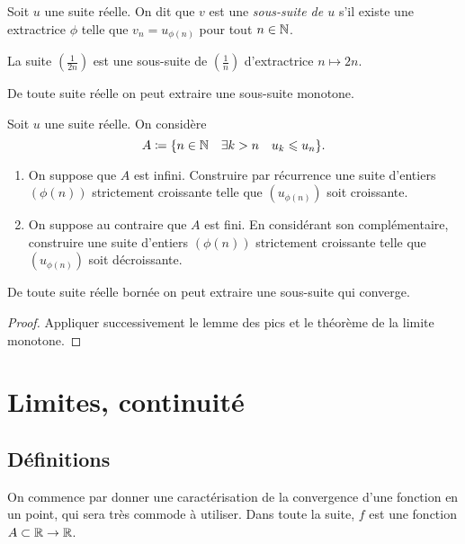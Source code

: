 \documentclass[../main.tex]{subfiles}
\begin{document}
\begin{mydef}
	Soit $u$ une suite réelle. On dit que $v$ est une \textit{sous-suite de $u$} s'il existe une extractrice $\phi$ telle que $v_n=u_{\phi(n)}$ pour tout $n\in\mathbb N$.
\end{mydef}

\begin{exe}
	La suite $\left(\frac{1}{2n}\right)$ est une sous-suite de $\left(\frac{1}{n}\right)$ d'extractrice $n\mapsto 2n$.
\end{exe}

\begin{lem}
	De toute suite réelle on peut extraire une sous-suite monotone.
\end{lem}

\begin{exo}[Démonstration, D]
	Soit $u$ une suite réelle. On considère 
	\[A\coloneqq \{n\in\mathbb N\quad \exists k>n\quad u_k\leqslant u_n\}.\]
	\begin{enumerate}
		\item On suppose que $A$ est infini. Construire par récurrence une suite d'entiers $(\phi(n))$ strictement croissante telle que $(u_{\phi(n)})$ soit croissante.
		\item On suppose au contraire que $A$ est fini. En considérant son complémentaire, construire une suite d'entiers $(\phi(n))$ strictement croissante telle que $(u_{\phi(n)})$ soit décroissante.
	\end{enumerate}
\end{exo}

\begin{thm}
	De toute suite réelle bornée on peut extraire une sous-suite qui converge.
\end{thm}

\begin{proof}
	Appliquer successivement le lemme des pics et le théorème de la limite monotone.
\end{proof}


\section{Limites, continuité}

\subsection{Définitions}

On commence par donner une caractérisation de la convergence d'une fonction en un point, qui sera très commode à utiliser. Dans toute la suite, $f$ est une fonction $A\subset\mathbb R\rightarrow\mathbb R$.
\end{document}
